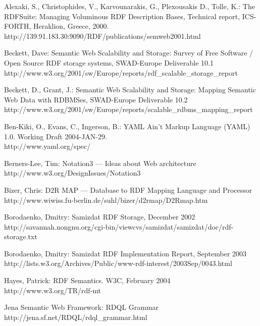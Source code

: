 \documentclass{llncs}
\begin{document}
%
\begin{thebibliography}{19}
%
Alexaki, S., Christophides, V., Karvounarakis, G., Plexousakis D., Tolle, K.:
The RDFSuite: Managing Voluminous RDF Description Bases, Technical report,
ICS-FORTH, Heraklion, Greece, 2000.\\
http://139.91.183.30:9090/RDF/publications/semweb2001.html

Beckett, Dave:
Semantic Web Scalability and Storage: Survey of Free Software / Open Source
RDF storage systems, SWAD-Europe Deliverable 10.1\\
http://www.w3.org/2001/sw/Europe/reports/rdf\_scalable\_storage\_report

Beckett, D., Grant, J.:
Semantic Web Scalability and Storage: Mapping Semantic Web Data with RDBMSes,
SWAD-Europe Deliverable 10.2\\
http://www.w3.org/2001/sw/Europe/reports/scalable\_rdbms\_mapping\_report

Ben-Kiki, O., Evans, C., Ingerson, B.:
YAML Ain't Markup Language (YAML) 1.0. Working Draft 2004-JAN-29.\\
http://www.yaml.org/spec/

Berners-Lee, Tim:
Notation3 --- Ideas about Web architecture\\
http://www.w3.org/DesignIssues/Notation3

Bizer, Chris:
D2R MAP --- Database to RDF Mapping Language and Processor\\
http://www.wiwiss.fu-berlin.de/suhl/bizer/d2rmap/D2Rmap.htm

Borodaenko, Dmitry:
Samizdat RDF Storage, December 2002\\
http://savannah.nongnu.org/cgi-bin/viewcvs/samizdat/samizdat/doc/rdf-storage.txt

Borodaenko, Dmitry:
Samizdat RDF Implementation Report, September 2003\\
http://lists.w3.org/Archives/Public/www-rdf-interest/2003Sep/0043.html

Hayes, Patrick:
RDF Semantics. W3C, February 2004\\
http://www.w3.org/TR/rdf-mt

Jena Semantic Web Framework:
RDQL Grammar\\
http://jena.sf.net/RDQL/rdql\_grammar.html


\end{thebibliography}
\end{document}

